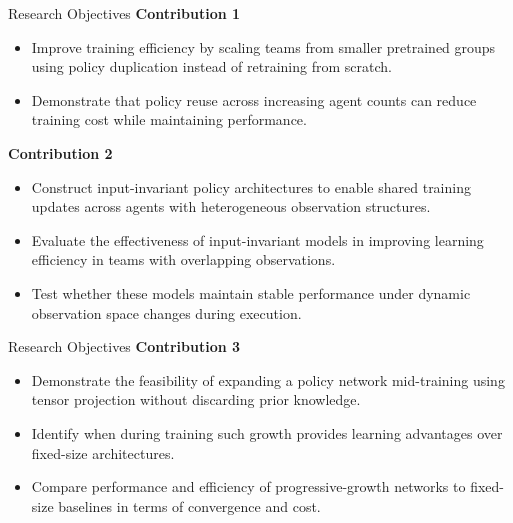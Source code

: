 \documentclass[xcolor={svgnames},aspectratio=169]{beamer}
\begin{document}
\begin{frame}{Research Objectives}
    \textbf{Contribution 1}
    \begin{itemize}
        \item {Improve training efficiency by scaling teams from smaller pretrained groups 
            using policy duplication instead of retraining from scratch.}
        \item {Demonstrate that policy reuse across increasing agent counts can reduce 
            training cost while maintaining performance.}
    \end{itemize}
    \vspace{1em}
    \textbf{Contribution 2}
    \begin{itemize}
        \item {Construct input-invariant policy architectures to enable shared training 
            updates across agents with heterogeneous observation structures.}
        \item {Evaluate the effectiveness of input-invariant models in improving learning 
            efficiency in teams with overlapping observations.}
        \item {Test whether these models maintain stable performance under dynamic 
            observation space changes during execution.}
    \end{itemize}
\end{frame}

\begin{frame}{Research Objectives}
    \textbf{Contribution 3}
    \begin{itemize}
        \item {Demonstrate the feasibility of expanding a policy network mid-training 
            using tensor projection without discarding prior knowledge.}
        \item {Identify when during training such growth provides learning advantages 
            over fixed-size architectures.}
        \item {Compare performance and efficiency of progressive-growth networks to 
            fixed-size baselines in terms of convergence and cost.}
    \end{itemize}
\end{frame}





\end{document}
